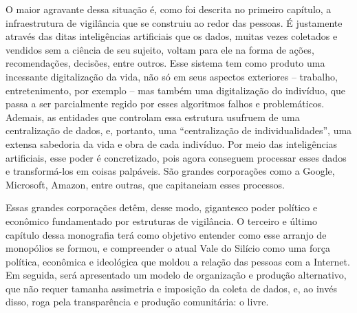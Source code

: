 O maior agravante dessa situação é, como foi descrita no primeiro capítulo, a infraestrutura de vigilância que se construiu ao redor das pessoas.
É justamente através das ditas inteligências artificiais que os dados, muitas vezes coletados e vendidos sem a ciência de seu sujeito, voltam para ele na forma de ações, recomendações, decisões, entre outros.
Esse sistema tem como produto uma incessante digitalização da vida, não só em seus aspectos exteriores -- trabalho, entretenimento, por exemplo -- mas também uma digitalização do indivíduo, que passa a ser parcialmente regido por esses algoritmos falhos e problemáticos.
Ademais, as entidades que controlam essa estrutura usufruem de uma centralização de dados, e, portanto, uma ``centralização de individualidades'', uma extensa sabedoria da vida e obra de cada indivíduo.
Por meio das inteligências artificiais, esse poder é concretizado, pois agora conseguem processar esses dados e transformá-los em coisas palpáveis.
São grandes corporações como a Google, Microsoft, Amazon, entre outras, que capitaneiam esses processos.

Essas grandes corporações detêm, desse modo, gigantesco poder político e econômico fundamentado por estruturas de vigilância.
O terceiro e último capítulo dessa monografia terá como objetivo entender como esse arranjo de monopólios se formou, e compreender o atual Vale do Silício como uma força política, econômica e ideológica que moldou a relação das pessoas com a Internet.
Em seguida, será apresentado um modelo de organização e produção alternativo, que não requer tamanha assimetria e imposição da coleta de dados, e, ao invés disso, roga pela transparência e produção comunitária: o \swr{} livre.
